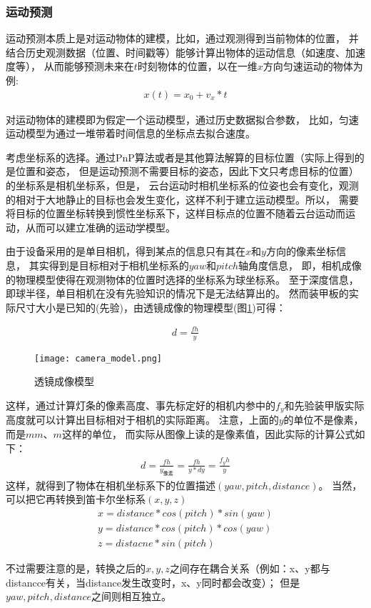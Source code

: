 \subsubsection{运动预测}


运动预测本质上是对运动物体的建模，比如，通过观测得到当前物体的位置，
并结合历史观测数据（位置、时间戳等）能够计算出物体的运动信息（如速度、加速度等），
从而能够预测未来在$t$时刻物体的位置，以在一维$x$方向匀速运动的物体为例: 
\begin{gather}
    x(t) = x_0 + v_x*t
\end{gather}

对运动物体的建模即为假定一个运动模型，通过历史数据拟合参数，
比如，匀速运动模型为通过一堆带着时间信息的坐标点去拟合速度。\par

考虑坐标系的选择。通过PnP\cite{wu2006pnp}算法或者是其他算法解算的目标位置（实际上得到的是位置和姿态，
但是运动预测不需要目标的姿态，因此下文只考虑目标的位置）的坐标系是相机坐标系，但是，
云台运动时相机坐标系的位姿也会有变化，观测的相对于大地静止的目标也会发生变化，这样不利于建立运动模型。所以，
需要将目标的位置坐标转换到惯性坐标系下，这样目标点的位置不随着云台运动而运动，从而可以建立准确的运动学模型。\par
由于设备采用的是单目相机，得到某点的信息只有其在$x$和$y$方向的像素坐标信息，
其实得到是目标相对于相机坐标系的$yaw$和$pitch$轴角度信息，
即，相机成像的物理模型使得在观测物体的位置时选择的坐标系为球坐标系。
至于深度信息，即球半径，单目相机在没有先验知识的情况下是无法结算出的。
然而装甲板的实际尺寸大小是已知的(先验)，由透镜成像的物理模型(图\ref{透镜成像模型})可得：\par
\begin{gather}
    d = \frac{fh}{y} 
\end{gather}

\begin{figure}[H]
    \centering
    \texttt{[image: camera\_model.png]} 
    \caption{透镜成像模型}
    \label{透镜成像模型} 
\end{figure}    
这样，通过计算灯条的像素高度、事先标定好的相机内参中的$f_y$和先验装甲版实际高度就可以计算出目标相对于相机的实际距离。
注意，上面的$y$的单位不是像素，而是$mm$、$m$这样的单位，
而实际从图像上读的是像素值，因此实际的计算公式如下：
\begin{gather}
    d=\frac{fh}{y_{像素}}=\frac{fh}{y*dy}=\frac{f_yh}{y}
\end{gather}
这样，就得到了物体在相机坐标系下的位置描述$(yaw,pitch, distance)$。
当然，可以把它再转换到笛卡尔坐标系$(x,y,z)$
\begin{gather}
    x = distance*cos(pitch)*sin(yaw) \\
    y = distance*cos(pitch)*cos(yaw) \\
    z = distacne * sin(pitch)
\end{gather} \par
不过需要注意的是，转换之后的$x,y,z$之间存在耦合关系（例如：x、y都与distancce有关，当distance发生改变时，x、y同时都会改变）；
但是$yaw,pitch,distance$之间则相互独立。\par

